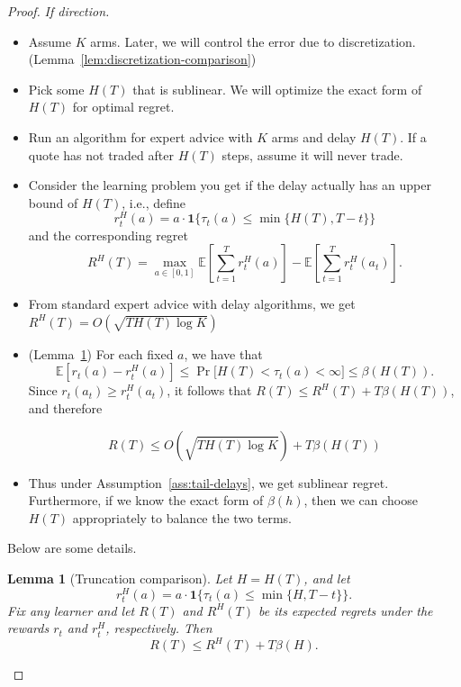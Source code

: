 \documentclass[11pt]{article}
\newtheorem{lemma}{Lemma}
\newcommand{\ind}[1]{\mathbf{1}\{#1\}}
\begin{document}
\begin{proof}
\emph{If direction.}

\begin{itemize}
    \item Assume $K$ arms. Later, we will control the error due to discretization. (Lemma~\ref{lem:discretization-comparison})

    \item Pick some $H(T)$ that is sublinear. We will optimize the exact form of $H(T)$ for optimal regret.

    \item Run an algorithm for expert advice with $K$ arms and delay $H(T)$. If a quote has not traded after $H(T)$ steps, assume it will never trade.

    \item Consider the learning problem you get if the delay actually has an upper
    bound of $H(T)$, i.e., define
    \[
        r^H_t(a) = a\cdot \ind{\tau_t(a) \leq \min\{H(T), T-t\}}
    \]
    and the corresponding regret
    \[
        R^H(T)
        =
        \max_{a \in [0,1]} \mathbb{E}\left[\sum_{t=1}^T r^H_t(a)\right]
        -
        \mathbb{E}\left[\sum_{t=1}^T r^H_t(a_t)\right].
    \]

    \item From standard expert advice with delay algorithms, we get $R^H(T) = O(\sqrt{TH(T)\log{K}})$

    \item (Lemma~\ref{lem:truncation-comparison}) For each fixed $a$, we have that
    \[
        \mathbb{E}\left[r_t(a) - r^H_t(a)\right]
        \leq
        \Pr\bigl[H(T) < \tau_t(a) < \infty\bigr]
        \leq
        \beta(H(T)).
    \]
    Since $r_t(a_t) \geq r^H_t(a_t)$, it follows that
    $R(T) \leq R^H(T) + T\beta(H(T))$, and therefore

    \[
    R(T) \leq O(\sqrt{TH(T)\log{K}}) + T\beta(H(T))
    \]

    \item Thus under Assumption~\ref{ass:tail-delays}, we get sublinear regret.
    Furthermore, if we know the exact form of $\beta(h)$, then we can choose
    $H(T)$ appropriately to balance the two terms.
\end{itemize}

Below are some details.

\begin{lemma}[Truncation comparison]\label{lem:truncation-comparison}
Let \(H = H(T)\), and let
\[
    r^H_t(a)
    =
    a\cdot \ind{\tau_t(a) \leq \min\{H,T-t\}}.
\]
Fix any learner and let \(R(T)\) and \(R^H(T)\) be its expected regrets under the rewards
\(r_t\) and \(r^H_t\), respectively.
Then
\[
    R(T) \leq R^H(T) + T\beta(H).
\]
\end{lemma}


\end{proof}
\end{document}

